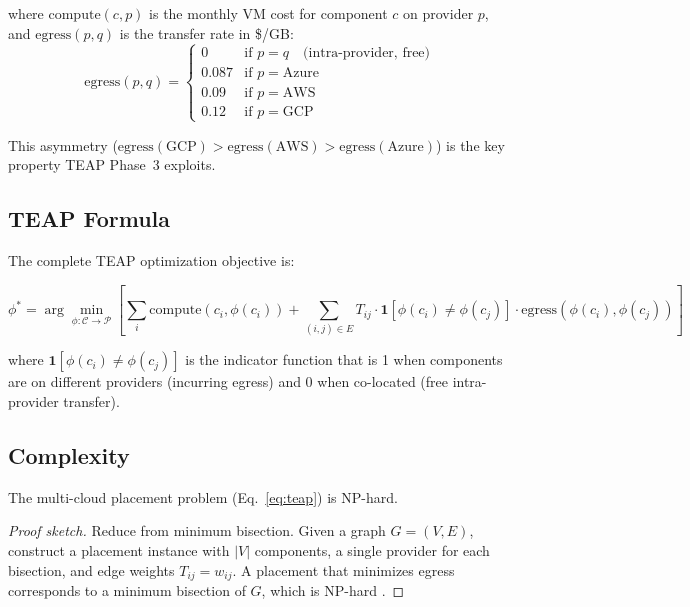 \documentclass[10pt,journal,compsoc]{IEEEtran}
\begin{document}
where $\text{compute}(c, p)$ is the monthly VM cost for component $c$ on
provider $p$, and $\text{egress}(p, q)$ is the transfer rate in \$/GB:
\begin{equation}
\text{egress}(p, q) =
\begin{cases}
0      & \text{if } p = q \quad \text{(intra-provider, free)} \\
0.087  & \text{if } p = \text{Azure} \\
0.09   & \text{if } p = \text{AWS} \\
0.12   & \text{if } p = \text{GCP}
\end{cases}
\end{equation}

This asymmetry ($\text{egress}(\text{GCP}) > \text{egress}(\text{AWS}) >
\text{egress}(\text{Azure})$) is the key property TEAP Phase~3 exploits.

\subsection{TEAP Formula}

The complete TEAP optimization objective is:

\begin{equation}
\label{eq:teap}
\phi^* = \arg\min_{\phi: \mathcal{C} \to \mathcal{P}} \left[
  \sum_{i} \text{compute}(c_i, \phi(c_i)) +
  \sum_{(i,j) \in E} T_{ij} \cdot \mathbf{1}[\phi(c_i) \neq \phi(c_j)] \cdot \text{egress}(\phi(c_i), \phi(c_j))
\right]
\end{equation}

where $\mathbf{1}[\phi(c_i) \neq \phi(c_j)]$ is the indicator function that
is 1 when components are on different providers (incurring egress) and 0 when
co-located (free intra-provider transfer).

\subsection{Complexity}

\begin{theorem}
The multi-cloud placement problem (Eq.~\ref{eq:teap}) is NP-hard.
\end{theorem}

\begin{proof}[Proof sketch]
Reduce from minimum bisection. Given a graph $G=(V,E)$, construct a placement
instance with $|V|$ components, a single provider for each bisection, and
edge weights $T_{ij} = w_{ij}$. A placement that minimizes egress corresponds
to a minimum bisection of $G$, which is NP-hard \cite{garey1979}.
\end{proof}
\end{document}
